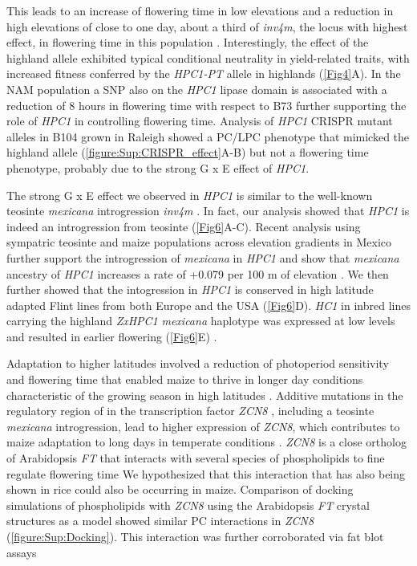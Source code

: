 \documentclass[9pt,twocolumn,twoside,lineno]{biorxiv}
\newcommand{\mex}{\textit{mexicana}\xspace}
\newcommand{\hpc}{\textit{HPC1}\xspace}
\begin{document}
This leads to an increase of flowering time in low elevations and a reduction in high elevations of close to one day, about a third of \textit{inv4m}, the locus with highest effect, in flowering time in this population \cite{Romero_Navarro2017-cn}. 
Interestingly, the effect of the highland allele exhibited typical conditional neutrality in yield-related traits, with increased fitness conferred by the \textit{HPC1-PT} allele in highlands (\cref{Fig4}A). 
In the NAM population a SNP also on the \hpc lipase domain is associated with a reduction of 8 hours in flowering time with respect to B73 \cite{Wallace2014-yy} further supporting the role of \hpc in controlling flowering time. 
Analysis of \hpc CRISPR mutant alleles in B104 grown in Raleigh showed a PC/LPC phenotype that mimicked the highland allele (\cref{figure:Sup:CRISPR_effect}A-B) but not a flowering time phenotype, probably due to the strong G x E effect of \hpc. 

The strong G x E effect we observed in \hpc is similar to the well-known teosinte \mex introgression \textit{inv4m} \cite{Crow2020-gene}. 
In fact, our analysis showed that \hpc is indeed an introgression from teosinte  (\cref{Fig6}A-C). 
Recent analysis using sympatric teosinte and maize populations across elevation gradients in Mexico further support the introgression of \mex in \hpc and show that \mex ancestry of \hpc increases a rate of +0.079 per 100 m of elevation \cite{Calfee2021-mr}.
We then further showed that the  intogression in \hpc is conserved in high latitude adapted Flint lines from both Europe and the USA (\cref{Fig6}D).
\textit{HC1} in inbred lines carrying the highland \textit{ZxHPC1} \mex haplotype was expressed at low levels and resulted in earlier flowering (\cref{Fig6}E) \cite{Kremling2018-gn}.  

Adaptation to higher latitudes involved a reduction of photoperiod sensitivity and flowering time that enabled maize to thrive in longer day conditions characteristic of the growing season in high latitudes \cite{Hung2012-ms, Swarts2017-ge, Yang2013-lg, Huang2018-ga}.
Additive mutations in the regulatory region of in the transcription factor \textit{ZCN8} \cite{Lazakis2011-nq}, including a teosinte \mex introgression, lead to higher expression of \textit{ZCN8}, which contributes to maize adaptation to long days in temperate conditions \cite{Guo2019-pn}.
\textit{ZCN8} is a close ortholog of Arabidopsis \textit{FT} that interacts with several species of phospholipids to fine regulate flowering time \cite{Nakamura2014-qf, Susila2021-dz}  
We hypothesized that this interaction that has also being shown in rice \cite{Qu2021-wc} could also be occurring in maize. 
Comparison of docking simulations of phospholipids with \textit{ZCN8} using the Arabidopsis \textit{FT} crystal structures as a model \cite{Nakamura2019-ht} showed similar PC interactions in \textit{ZCN8} (\cref{figure:Sup:Docking}).
This interaction was further corroborated via fat blot assays %
\end{document}
